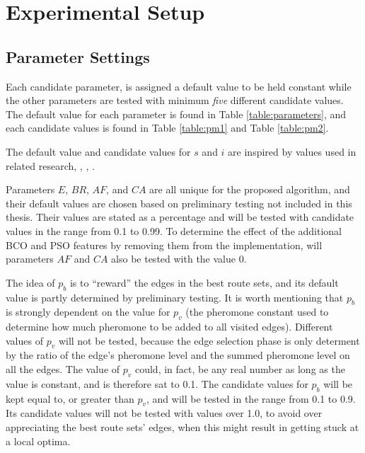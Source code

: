 \section{Experimental Setup}


\subsection{Parameter Settings}
\label{subsec:parameterSettings_setup}

Each candidate parameter, is assigned a default value to be held constant while the other parameters are tested with minimum \textit{five} different candidate values. The default value for each parameter is found in Table \vref{table:parameters}, and each candidate values is found in Table \vref{table:pm1} and Table \vref{table:pm2}.

The default value and candidate values for $s$ and $i$ are inspired by values used in related research\citep{salehi-nezhad07}, \citep{poorzahedy11}, \citep{sedighpour14}, \citep{kechagiopoulos14}.

Parameters $E$, $BR$, $AF$, and $CA$ are all unique for the proposed algorithm, and their default values are chosen based on preliminary testing not included in this thesis. Their values are stated as a percentage and will be tested with candidate values in the range from 0.1 to 0.99. To determine the effect of the additional BCO and PSO features by removing them from the implementation, will parameters $AF$ and $CA$ also be tested with the value 0.

The idea of $p_b$ is to ``reward'' the edges in the best route sets, and its default value is partly determined by preliminary testing. It is worth mentioning that $p_ b$ is strongly dependent on the value for $p_v$ (the pheromone constant used to determine how much pheromone to be added to all visited edges). Different values of $p_v$ will not be tested, because the edge selection phase is only determent by the ratio of the edge's pheromone level and the summed pheromone level on all the edges. The value of $p_v$ could, in fact, be any real number as long as the value is constant, and is therefore sat to 0.1. The candidate values for $p_b$ will be kept equal to, or greater than $p_v$, and will be tested in the range from 0.1 to 0.9. Its candidate values will not be tested with values over 1.0, to avoid over appreciating the best route sets' edges, when this might result in getting stuck at a local optima.

